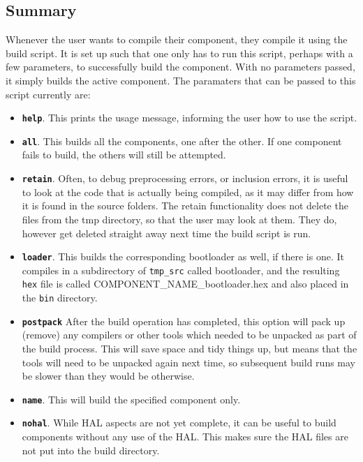 \documentclass[a4paper, oneside, 11pt, titlepage, onecolumn, openright]{report}
\begin{document}
\subsection{Summary}
			\label{ss:buildSummary}
			Whenever the user wants to compile their component, they compile it using the build script. It is set up such that one only has to run this script, perhaps with a few parameters, to successfully build the component. With no parameters passed, it simply builds the active component.
			The paramaters that can be passed to this script currently are:
			
\begin{itemize}
\item \texttt{\textbf{help}}. This prints the usage message, informing the user how to use the script.
\item \texttt{\textbf{all}}. This builds all the components, one after the other. If one component fails to build, the others will still be attempted.
\item \texttt{\textbf{retain}}. Often, to debug preprocessing errors, or inclusion errors, it is useful to look at the code that is actually being compiled, as it may differ from how it is found in the source folders. The retain functionality does not delete the files from the tmp directory, so that the user may look at them. They do, however get deleted straight away next time the build script is run.
\item \texttt{\textbf{loader}}. This builds the corresponding bootloader as well, if there is one. It compiles in a subdirectory of \texttt{tmp\_src} called bootloader, and the resulting \texttt{hex} file is called COMPONENT\_NAME\_bootloader.hex and also placed in the \texttt{bin} directory.
\item	\texttt{\textbf{postpack}} After the build operation has completed, this option will pack up (remove) any compilers or other tools which needed to be unpacked as part of the build process.  This will save space and tidy things up, but means that the tools will need to be unpacked again next time, so subsequent build runs may be slower than they would be otherwise.
\item \texttt{\textbf{name}}. This will build the specified component only.
\item \texttt{\textbf{nohal}}. While HAL aspects are not yet complete, it can be useful to build components without any use of the HAL. This makes sure the HAL files are not put into the build directory.
\end{itemize}
\end{document}
